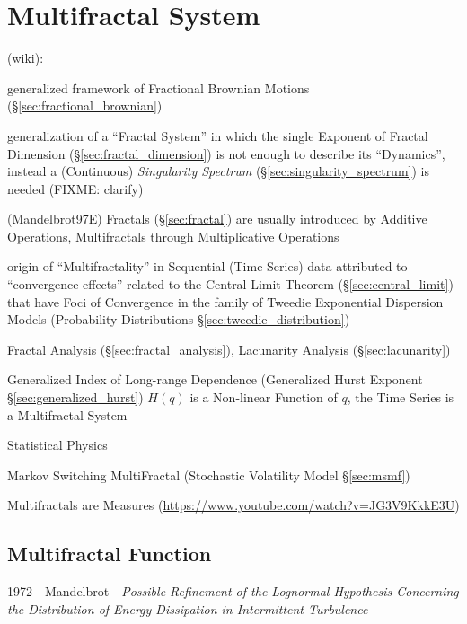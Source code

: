 \section{Multifractal System}\label{sec:multifractal_system}

(wiki):

generalized framework of Fractional Brownian Motions
(\S\ref{sec:fractional_brownian})

generalization of a ``Fractal System'' in which the single Exponent of Fractal
Dimension (\S\ref{sec:fractal_dimension}) is not enough to describe its
``Dynamics'',  instead a (Continuous) \emph{Singularity Spectrum}
(\S\ref{sec:singularity_spectrum}) is needed (FIXME: clarify)

(Mandelbrot97E) Fractals (\S\ref{sec:fractal}) are usually introduced by
Additive Operations, Multifractals through Multiplicative Operations

origin of ``Multifractality'' in Sequential (Time Series) data attributed to
``convergence effects'' related to the Central Limit Theorem
(\S\ref{sec:central_limit}) that have Foci of Convergence in the family of
Tweedie Exponential Dispersion Models (Probability Distributions
\S\ref{sec:tweedie_distribution})

Fractal Analysis (\S\ref{sec:fractal_analysis}), Lacunarity Analysis
(\S\ref{sec:lacunarity})

Generalized Index of Long-range Dependence (Generalized Hurst Exponent
\S\ref{sec:generalized_hurst}) $H(q)$ is a Non-linear Function of $q$, the Time
Series is a Multifractal System

Statistical Physics

\fist Markov Switching MultiFractal (Stochastic Volatility Model
\S\ref{sec:msmf})

Multifractals are Measures (\url{https://www.youtube.com/watch?v=JG3V9KkkE3U})



\subsection{Multifractal Function}\label{sec:multifractal_function}

1972 - Mandelbrot - \emph{Possible Refinement of the Lognormal Hypothesis
  Concerning the Distribution of Energy Dissipation in Intermittent Turbulence}

